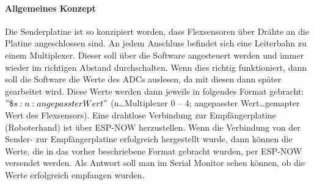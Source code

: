 \documentclass[titlepage,12pt,twoside]{article}
\begin{document}
\paragraph{Allgemeines Konzept}
\hfill \break
\hfill \break
Die Senderplatine ist so konzipiert worden, dass Flexsensoren über Drähte an die Platine angeschlossen sind. An jedem Anschluss 
befindet sich eine Leiterbahn zu einem Multiplexer. Dieser soll über die Software angesteuert werden und immer wieder im 
richtigen Abstand durchschalten. Wenn dies richtig funktioniert, dann soll die Software die Werte des ADCs auslesen, da mit 
diesen dann später gearbeitet wird. Diese Werte werden dann jeweils in folgendes Format gebracht: $"\$s:n:angepassterWert"$ 
(n…Multiplexer 0 – 4; angepasster Wert…gemapter Wert des Flexsensors). Eine drahtlose Verbindung zur Empfängerplatine 
(Roboterhand) ist über ESP-NOW herzustellen. Wenn die Verbindung von der Sender- zur Empfängerplatine erfolgreich hergestellt 
wurde, dann können die Werte, die in das vorher beschriebene Format gebracht wurden, per ESP-NOW versendet werden. Als Antwort 
soll man im Serial Monitor sehen können, ob die Werte erfolgreich empfangen wurden. \\
\\
\end{document}
